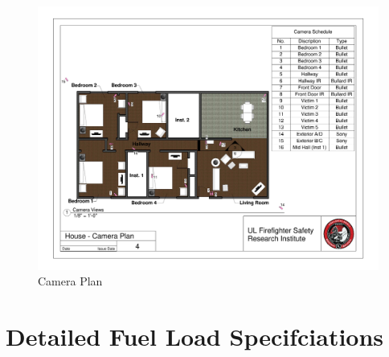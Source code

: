 \begin{figure}
\includegraphics[width=\textheight]{../0_Images/Appendix_Figures/Camera_Plan}
\caption[]{Camera Plan}
\label{fig:appendix_cameras}
\end{figure}

\clearpage \large
\chapter{Detailed Fuel Load Specifciations} \label{App:Fuels}

